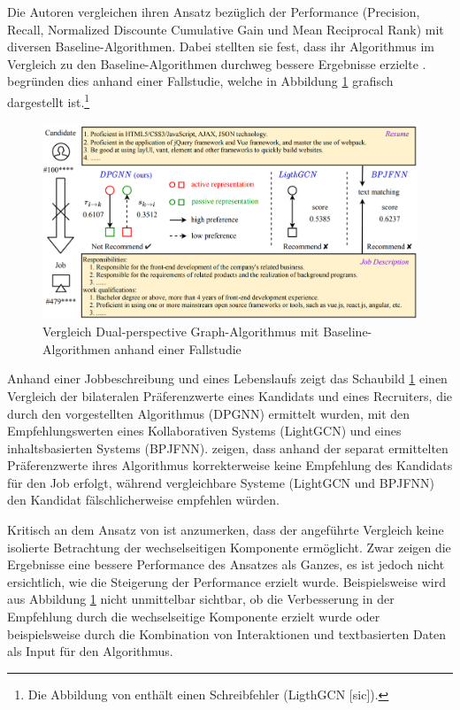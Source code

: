Die Autoren vergleichen ihren Ansatz bezüglich der Performance (Precision, Recall, Normalized Discounte Cumulative Gain und Mean Reciprocal Rank) mit diversen Baseline-Algorithmen.
Dabei stellten sie fest, dass ihr Algorithmus im Vergleich zu den Baseline-Algorithmen durchweg bessere Ergebnisse erzielte \cite[S. 110]{yang:inproceedings}.
\textcite[S. 110]{yang:inproceedings} begründen dies anhand einer Fallstudie, welche in Abbildung \ref{fig:relatedwork:abb4} grafisch dargestellt ist.\footnote{Die Abbildung von \textcite[S. 111]{yang:inproceedings} enthält einen Schreibfehler (LigthGCN [sic]).}
\begin{figure}[H]
    \centering
	\includegraphics[width=1.0\textwidth]{gfx/dpg-case-study.png}
	\caption[Vergleich dual-perspective Graph-Algorithmus mit Base\-line-Algorithmen anhand einer Fallstudie]{Vergleich Dual-perspective Graph-Algorithmus mit Baseline-Algo\-rithmen anhand einer Fallstudie\\
    \cite[S. 111]{yang:inproceedings}}
	\label{fig:relatedwork:abb4}
\end{figure}
Anhand einer Jobbeschreibung und eines Lebenslaufs zeigt das Schaubild \ref{fig:relatedwork:abb4} einen Vergleich der bilateralen Präferenzwerte eines Kandidats und eines Recruiters, die durch den vorgestellten Algorithmus (DPGNN) ermittelt wurden, mit den Empfehlungswerten eines Kollaborativen Systems (LightGCN) und eines inhaltsbasierten Systems (BPJFNN).
\textcite[S. 110]{yang:inproceedings} zeigen, dass anhand der separat ermittelten Präferenzwerte ihres Algorithmus korrekterweise keine Empfehlung des Kandidats für den Job erfolgt, während vergleichbare Systeme (LightGCN und BPJFNN) den Kandidat fälschlicherweise empfehlen würden.

Kritisch an dem Ansatz von \textcite[S. 102ff.]{yang:inproceedings} ist anzumerken, dass der angeführte Vergleich keine isolierte Betrachtung der wechselseitigen Komponente ermöglicht.
Zwar zeigen die Ergebnisse eine bessere Performance des Ansatzes als Ganzes, es ist jedoch nicht ersichtlich, wie die Steigerung der Performance erzielt wurde.
Beispielsweise wird aus Abbildung \ref{fig:relatedwork:abb4} nicht unmittelbar sichtbar, ob die Verbesserung in der Empfehlung durch die wechselseitige Komponente erzielt wurde oder beispielsweise durch die Kombination von Interaktionen und textbasierten Daten als Input für den Algorithmus.

